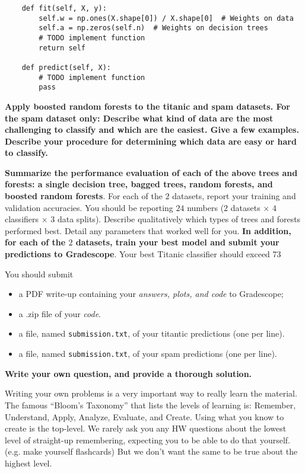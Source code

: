 \documentclass[preview]{standalone}
\begin{document}
\begin{Parts}
\begin{verbatim}
    def fit(self, X, y):
        self.w = np.ones(X.shape[0]) / X.shape[0]  # Weights on data
        self.a = np.zeros(self.n)  # Weights on decision trees
        # TODO implement function
        return self

    def predict(self, X):
        # TODO implement function
        pass
\end{verbatim}




\Part \textbf{Apply boosted random forests to the titanic and spam datasets. For the spam dataset only: Describe what kind of data are the most challenging to classify and which are the easiest. Give a few examples. Describe your procedure for determining which data are easy or hard to classify.}



\Part \textbf{Summarize the performance evaluation of each of the above trees and forests: a single decision tree, bagged trees, random forests, and boosted random forests}. For each of the $2$ datasets, report your training and validation accuracies. You should be reporting $24$ numbers ($2$ datasets $\times$ $4$ classifiers $\times$ $3$ data splits). Describe qualitatively which types of trees and forests performed best. Detail any parameters that worked well for you. \textbf{In addition, for each of the $2$ datasets, train your best model and submit your predictions to Gradescope}. Your best Titanic classifier should exceed 73\




\Part You should submit
\begin{itemize}
	\item a PDF write-up containing your \textit{answers, plots, and code} to Gradescope;
	\item a .zip file of your \textit{code}.
	\item a file, named \texttt{submission.txt}, of your titantic predictions (one per line).
	\item a file, named \texttt{submission.txt}, of your spam predictions (one per line).
\end{itemize}

\end{Parts}


{\bf Write your own question, and provide a thorough solution.}

Writing your own problems is a very important way to really learn
the material. The famous ``Bloom's Taxonomy'' that lists the levels of
learning is: Remember, Understand, Apply, Analyze, Evaluate, and
Create. Using what you know to create is the top-level. We rarely ask
you any HW questions about the lowest level of straight-up
remembering, expecting you to be able to do that yourself. (e.g. make
yourself flashcards) But we don't want the same to be true about the
highest level.
\end{document}
